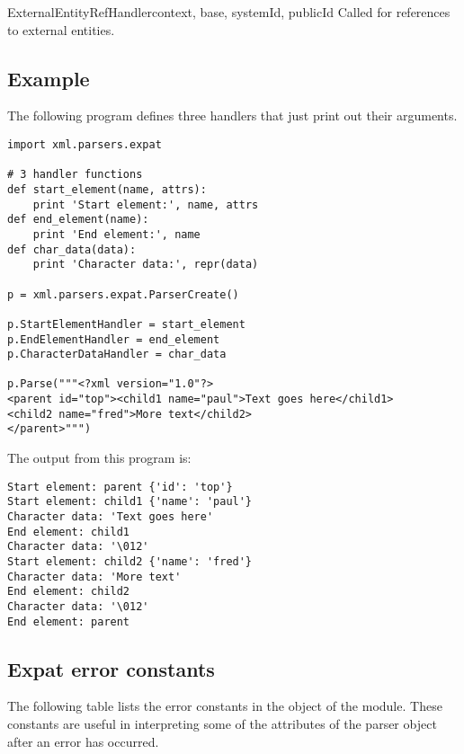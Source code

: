 \begin{methoddesc}[xmlparser]{ExternalEntityRefHandler}{context, base,
                                                        systemId, publicId}
Called for references to external entities.  
\end{methoddesc}


\subsection{Example \label{expat-example}}

The following program defines three handlers that just print out their
arguments.

\begin{verbatim}
import xml.parsers.expat

# 3 handler functions
def start_element(name, attrs):
    print 'Start element:', name, attrs
def end_element(name):
    print 'End element:', name
def char_data(data):
    print 'Character data:', repr(data)

p = xml.parsers.expat.ParserCreate()

p.StartElementHandler = start_element
p.EndElementHandler = end_element
p.CharacterDataHandler = char_data

p.Parse("""<?xml version="1.0"?>
<parent id="top"><child1 name="paul">Text goes here</child1>
<child2 name="fred">More text</child2>
</parent>""")
\end{verbatim}

The output from this program is:

\begin{verbatim}
Start element: parent {'id': 'top'}
Start element: child1 {'name': 'paul'}
Character data: 'Text goes here'
End element: child1
Character data: '\012'
Start element: child2 {'name': 'fred'}
Character data: 'More text'
End element: child2
Character data: '\012'
End element: parent
\end{verbatim}


\subsection{Expat error constants \label{expat-errors}}

The following table lists the error constants in the
 object of the  module.  These
constants are useful in interpreting some of the attributes of the
parser object after an error has occurred.

